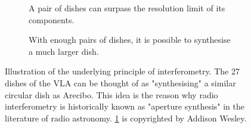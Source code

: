 \begin{figure}[ht]
\centering
\begin{subfigure}{.43\textwidth}
\caption{\label{fig.baseline.image} A pair of dishes can surpass the resolution limit of its components.}
\end{subfigure}
\hfill
\begin{subfigure}{.43\textwidth}
\caption{\label{fig.arecibo.vla} With enough pairs of dishes, it is possible to synthesise a much larger dish.}
\end{subfigure}
\caption{\label{fig.aperture.synthesis} Illustration of the underlying principle of interferometry. The 27 dishes of the VLA can be thought of as "synthesising" a similar circular dish as Arecibo. This idea is the reason why radio interferometry is historically known as "aperture synthesis" in the literature of radio astronomy. \cref{fig.baseline.image} is copyrighted by Addison Wesley.} %
\end{figure}

